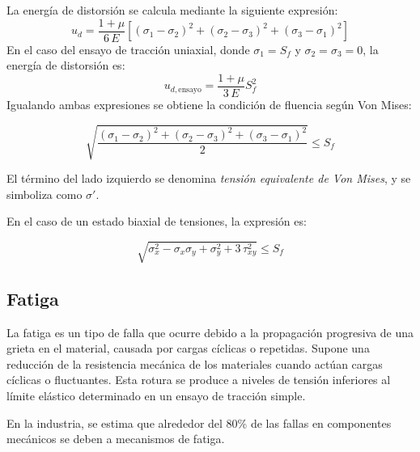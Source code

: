 \documentclass[spanish,11pt,a4paper]{article}
\begin{document}
	La energía de distorsión se calcula mediante la siguiente expresión:
	\[u_d = \dfrac{1+\mu}{6\,E} \left[(\sigma_1 - \sigma_2)^2 + (\sigma_2 - \sigma_3)^2 + (\sigma_3 - \sigma_1)^2\right]\]
	En el caso del ensayo de tracción uniaxial, donde $\sigma_1 = S_f$ y $\sigma_2=\sigma_3=0$, la energía de distorsión es: \[u_{d,\text{ensayo}} = \dfrac{1+\mu}{3\, E}S_f^2\]
	Igualando ambas expresiones se obtiene la condición de fluencia según Von Mises:
	\begin{tcolorbox}\begin{equation*}
			\sqrt{\dfrac{(\sigma_1 - \sigma_2)^2 + (\sigma_2 - \sigma_3)^2 + (\sigma_3 - \sigma_1)^2}{2}} \leq  S_f
		\end{equation*}
	\end{tcolorbox}
	El término del lado izquierdo se denomina \emph{tensión equivalente de Von Mises}, y se simboliza como $\sigma'$.
	
	En el caso de un estado biaxial de tensiones, la expresión es:
	\begin{impo}
		\begin{equation*}\sqrt{\sigma_x^2 - \sigma_x \sigma_y + \sigma_y^2 + 3\, \tau_{xy}^2}\leq S_f
		\end{equation*}
	\end{impo}
	\subsection{Fatiga}
	La fatiga es un tipo de falla que ocurre debido a la propagación progresiva de una grieta en el material, causada por cargas cíclicas o repetidas. Supone una reducción de la resistencia mecánica de los materiales cuando actúan cargas cíclicas o fluctuantes. Esta rotura se produce a niveles de tensión inferiores al límite elástico determinado en un ensayo de tracción simple.
	
	
	En la industria, se estima que alrededor del 80\% de las fallas en componentes mecánicos se deben a mecanismos de fatiga.
	
\end{document}

